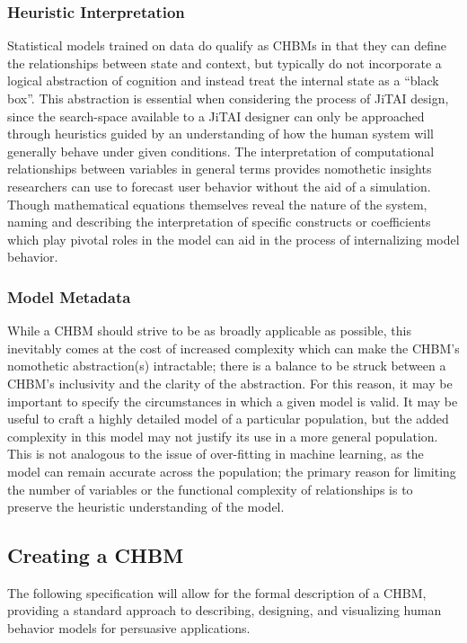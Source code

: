 \documentclass[runningheads,a4paper]{llncs}
\begin{document}
\subsubsection{Heuristic Interpretation}
Statistical models trained on data do qualify as CHBMs in that they can define the relationships between state and context, but typically do not incorporate a logical abstraction of cognition and instead treat the internal state as a “black box”.
This abstraction is essential when considering the process of JiTAI design, since the search-space available to a JiTAI designer can only be approached through heuristics guided by an understanding of how the human system will generally behave under given conditions.
The interpretation of computational relationships between variables in general terms provides nomothetic insights researchers can use to forecast user behavior without the aid of a simulation.
Though mathematical equations themselves reveal the nature of the system, naming and describing the interpretation of specific constructs or coefficients which play pivotal roles in the model can aid in the process of internalizing model behavior.
\subsubsection{Model Metadata}
While a CHBM should strive to be as broadly applicable as possible, this inevitably comes at the cost of increased complexity which can make the CHBM’s nomothetic abstraction(s) intractable; there is a balance to be struck between a CHBM’s inclusivity and the clarity of the abstraction.
For this reason, it may be important to specify the circumstances in which a given model is valid.
It may be useful to craft a highly detailed model of a particular population, but the added complexity in this model may not justify its use in a more general population.
This is not analogous to the issue of over-fitting in machine learning, as the model can remain accurate across the population; the primary reason for limiting the number of variables or the functional complexity of relationships is to preserve the heuristic understanding of the model.

\subsection{Creating a CHBM}
The following specification will allow for the formal description of a CHBM, providing a standard approach to describing, designing, and visualizing human behavior models for persuasive applications.
\end{document}
